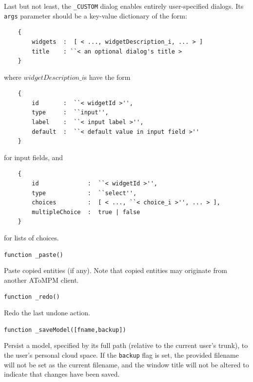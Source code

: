 \documentclass{article}
\numberwithin{equation}{section}
\numberwithin{figure}{section}
\begin{document}
Last but not least, the \texttt{\_CUSTOM} dialog enables entirely user-specified dialogs. Its \texttt{args} parameter should be a key-value dictionary of the form:
\begin{verbatim}
    {
        widgets  :  [ < ..., widgetDescription_i, ... > ]
        title    : ``< an optional dialog's title >		                             
    }
\end{verbatim}
where $widgetDescription\_i$s have the form
\begin{verbatim}
    {
        id       :  ``< widgetId >'',
        type     :  ``input'',
        label    :  ``< input label >'',
        default  :  ``< default value in input field >''
    }
\end{verbatim}
for input fields, and
\begin{verbatim}
    {
        id              :  ``< widgetId >'',
        type            :  ``select'',
        choices         :  [ < ..., ``< choice_i >'', ... > ],
        multipleChoice  :  true | false
    }
\end{verbatim}
for lists of choices.
\vspace*{1em}


\begin{center}	{\large \texttt{function \_paste()}} \end{center}

Paste copied entities (if any). Note that copied entities may originate from another AToMPM client.\\
\vspace*{1em}


\begin{center}	{\large \texttt{function \_redo()}} \end{center}

Redo the last undone action.\\
\vspace*{1em}


\begin{center}	{\large \texttt{function \_saveModel([fname,backup])}} \end{center}

Persist a model, specified by its full path (relative to the current user's trunk), to the user's personal cloud space. If the \texttt{backup} flag is set, the provided filename will not be set as the current filename, and the window title will not be altered to indicate that changes have been saved. \\
\vspace*{1em}
\end{document}
